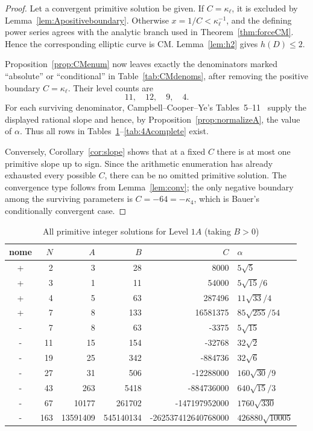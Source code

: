 \documentclass[11pt,a4paper]{amsart} %
\theoremstyle{definition}
\begin{document}
\begin{proof}
Let a convergent primitive solution be given. If \(C=\kappa_\ell\), it is
excluded by Lemma~\ref{lem:Apositiveboundary}. Otherwise
\(x=1/C<\kappa_\ell^{-1}\), and the defining power series agrees with the
analytic branch used in Theorem~\ref{thm:forceCM}. Hence the corresponding
elliptic curve is CM. Lemma~\ref{lem:h2} gives \(h(D)\le2\).

Proposition~\ref{prop:CMenum} now leaves exactly the denominators marked
``absolute'' or ``conditional'' in Table~\ref{tab:CMdenoms}, after removing
the positive boundary \(C=\kappa_\ell\). Their level counts are
\[
11,\quad12,\quad9,\quad4.
\]
For each surviving denominator, Campbell--Cooper--Ye's
Tables~5--11~\cite{CCY} supply the displayed rational slope and hence, by
Proposition~\ref{prop:normalizeA}, the value of \(\alpha\). Thus all rows in
Tables~\ref{tab:1A}--\ref{tab:4Acomplete} exist.

Conversely, Corollary~\ref{cor:slope} shows that at a fixed \(C\) there is at
most one primitive slope up to sign. Since the arithmetic enumeration has
already exhausted every possible \(C\), there can be no omitted primitive
solution. The convergence type follows from Lemma~\ref{lem:conv}; the only
negative boundary among the surviving parameters is \(C=-64=-\kappa_4\),
which is Bauer's conditionally convergent case.
\end{proof}

\begin{table}[htbp]
\centering
\caption{All primitive integer solutions for Level \(1A\) (taking \(B>0\))}\label{tab:1A}
\footnotesize
\setlength{\tabcolsep}{4pt}
\renewcommand{\arraystretch}{1.14}
\begin{tabular}{@{}c r r r r l@{}}
\toprule
nome & \(N\) & \(A\) & \(B\) & \(C\) & \(\alpha\)\\
\midrule
+&2&3&28&8000&\(5\sqrt5\)\\
+&3&1&11&54000&\(5\sqrt{15}/6\)\\
+&4&5&63&287496&\(11\sqrt{33}/4\)\\
+&7&8&133&16581375&\(85\sqrt{255}/54\)\\
-&7&8&63&-3375&\(5\sqrt{15}\)\\
-&11&15&154&-32768&\(32\sqrt2\)\\
-&19&25&342&-884736&\(32\sqrt6\)\\
-&27&31&506&-12288000&\(160\sqrt{30}/9\)\\
-&43&263&5418&-884736000&\(640\sqrt{15}/3\)\\
-&67&10177&261702&-147197952000&\(1760\sqrt{330}\)\\
-&163&13591409&545140134&-262537412640768000&\(426880\sqrt{10005}\)\\
\bottomrule
\end{tabular}
\end{table}
\end{document}
